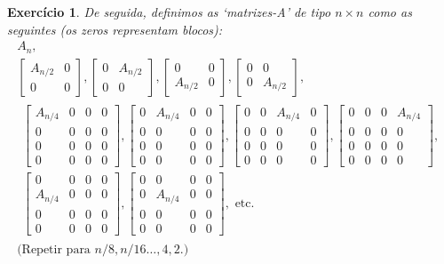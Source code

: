 \documentclass{article}
\newtheorem{ex}{Exercício}[section]
\begin{document}
\begin{ex}
De seguida, definimos as `matrizes-A' de tipo $n \times n$ como as seguintes (os zeros representam blocos):
\begin{gather*}
A_n,\\
\begin{bmatrix}
A_{n/2} & 0\\
0 & 0
\end{bmatrix},
\begin{bmatrix}
0 & A_{n/2}\\
0 & 0
\end{bmatrix},
\begin{bmatrix}
0 & 0\\
A_{n/2} & 0
\end{bmatrix},
\begin{bmatrix}
0 & 0\\
0 & A_{n/2}
\end{bmatrix},\\
\begin{multlined}
\begin{bmatrix}
A_{n/4} & 0 & 0 & 0\\
0 & 0 & 0 & 0\\
0 & 0 & 0 & 0\\
0 & 0 & 0 & 0
\end{bmatrix},
\begin{bmatrix}
0 & A_{n/4} & 0 & 0\\
0 & 0 & 0 & 0\\
0 & 0 & 0 & 0\\
0 & 0 & 0 & 0
\end{bmatrix},
\begin{bmatrix}
0 & 0 & A_{n/4} & 0\\
0 & 0 & 0 & 0\\
0 & 0 & 0 & 0\\
0 & 0 & 0 & 0
\end{bmatrix},
\begin{bmatrix}
0 & 0 & 0 & A_{n/4}\\
0 & 0 & 0 & 0\\
0 & 0 & 0 & 0\\
0 & 0 & 0 & 0
\end{bmatrix},\\
\begin{bmatrix}
0 & 0 & 0 & 0\\
A_{n/4} & 0 & 0 & 0\\
0 & 0 & 0 & 0\\
0 & 0 & 0 & 0
\end{bmatrix},
\begin{bmatrix}
0 & 0 & 0 & 0\\
0 & A_{n/4} & 0 & 0\\
0 & 0 & 0 & 0\\
0 & 0 & 0 & 0
\end{bmatrix}, \text{ etc.}
\end{multlined}\\
\text{(Repetir para $n/8, n/16 \dots, 4, 2.$)}
\end{gather*}


\end{ex}
\end{document}
